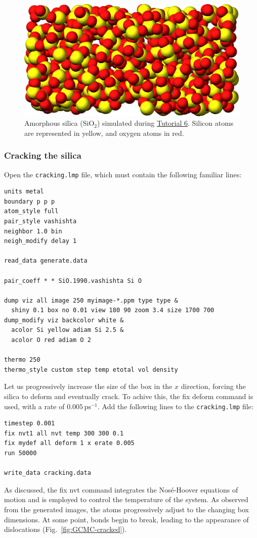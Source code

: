 \documentclass[9pt,tutorial]{livecoms}
\newcommand{\lmpcmd}[1]{\colorbox{listing}{\textcolor{command}{\small{#1}}}} %
\newcommand{\flecmd}[1]{\textcolor{command}{\texttt{#1}}} %
\begin{document}
\begin{figure}
\centering
\includegraphics[width=0.9\linewidth]{GCMC-generate}
\caption{Amorphous silica ($\text{SiO}_2$) simulated
during \hyperref[gcmc-silica-label]{Tutorial 6}.  Silicon atoms are
represented in yellow, and oxygen atoms in red.}
\label{fig:GCMC-snapshot}
\end{figure}

\subsubsection{Cracking the silica}

Open the \flecmd{cracking.lmp} file, which must contain the following familiar lines:
\begin{lstlisting}
units metal
boundary p p p
atom_style full
pair_style vashishta
neighbor 1.0 bin
neigh_modify delay 1

read_data generate.data

pair_coeff * * SiO.1990.vashishta Si O

dump viz all image 250 myimage-*.ppm type type &
  shiny 0.1 box no 0.01 view 180 90 zoom 3.4 size 1700 700
dump_modify viz backcolor white &
  acolor Si yellow adiam Si 2.5 &
  acolor O red adiam O 2

thermo 250
thermo_style custom step temp etotal vol density
\end{lstlisting}
Let us progressively increase the size of the box in the $x$ direction,
forcing the silica to deform and eventually crack.  To achive this,
the \lmpcmd{fix deform} command is used, with a rate
of $0.005\,\text{ps}^{-1}$.  Add the following lines to
the \flecmd{cracking.lmp} file:
\begin{lstlisting}
timestep 0.001
fix nvt1 all nvt temp 300 300 0.1
fix mydef all deform 1 x erate 0.005
run 50000

write_data cracking.data
\end{lstlisting}
As discussed, the \lmpcmd{fix nvt} command integrates the Nosé-Hoover equations
of motion and is employed to control the temperature of the system.
As observed from the generated images, the atoms
progressively adjust to the changing box dimensions.  At some point,
bonds begin to break, leading to the appearance of
dislocations (Fig.~\ref{fig:GCMC-cracked}).
\end{document}

